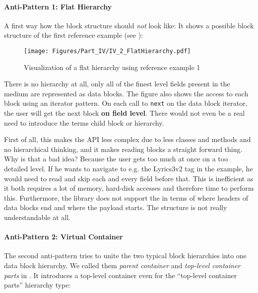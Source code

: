 \paragraph{Anti-Pattern 1: Flat Hierarchy}
\label{sec:AntiPattern1FlatHierarchy}

A first way how the block structure should \emph{not} look like: It shows a possible block structure of the first reference example (see ):

\begin{figure}[H]
	\centering
	\texttt{[image: Figures/Part\_IV/IV\_2\_FlatHierarchy.pdf]}
	\caption{Visualization of a flat hierarchy using reference example 1}
	\label{fig:IV_2_FlatHierarchy}
\end{figure}

There is no hierarchy at all, only all of the finest level fields present in the medium are represented as data blocks. The figure also shows the access to each block using an iterator pattern. On each call to \texttt{next} on the data block iterator, the user will get the next block \textbf{on field level}. There would not even be a real need to introduce the terms child block or hierarchy.

First of all, this makes the API less complex due to less classes and methods and no hierarchical thinking, and it makes reading blocks a straight forward thing. Why is that a bad idea? Because the user gets too much at once on a too detailed level. If he wants to navigate to e.g. the Lyrics3v2 tag in the example, he would need to read and skip each and every field before that. This is inefficient as it both requires a lot of memory, hard-disk accesses and therefore time to perform this. Furthermore, the library does not support the \ACTORuser{} in terms of where headers of data blocks end and where the payload starts. The structure is not really understandable at all.


\paragraph{Anti-Pattern 2: Virtual Container}
\label{sec:AntiPattern2VirtualContainer}

The second anti-pattern tries to unite the two typical block hierarchies into one data block hierarchy. We called them \emph{parent container} and \emph{top-level container parts} in . It introduces a top-level container even for the ``top-level container parts'' hierarchy type:

